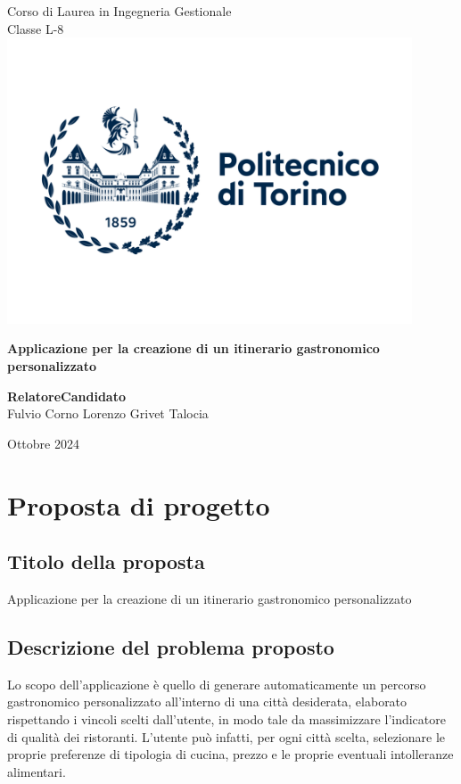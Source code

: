 \documentclass{report}
\begin{document}
\thispagestyle{empty}
\begin{center}
    \Large Corso di Laurea in Ingegneria Gestionale\\
\Large Classe L-8\\[2cm]

\includegraphics[width=12cm]{images/Logo_PoliTo_scritta.png}

\vspace*{2cm}

{\Huge \bfseries Applicazione per la creazione di un itinerario gastronomico personalizzato}

\vfill

{\Large \bfseries Relatore\hfill Candidato}\\
{\Large Fulvio Corno \hfill Lorenzo Grivet Talocia}

\vspace*{1cm}
{\Large Ottobre 2024}

\end{center}


\tableofcontents

\hypersetup{
linkcolor=lnkcolor
}

\chapter{Proposta di progetto}\label{cap_proposta}

\section{Titolo della proposta}\label{sec_titolo}
Applicazione per la creazione di un itinerario gastronomico personalizzato

\section{Descrizione del problema proposto}\label{sec_descrizione}
Lo scopo dell'applicazione è quello di generare automaticamente un percorso gastronomico personalizzato all'interno di una città desiderata, elaborato rispettando i vincoli scelti dall'utente, in modo tale da massimizzare l'indicatore di qualità dei ristoranti. L'utente può infatti, per ogni città scelta, selezionare le proprie preferenze di tipologia di cucina, prezzo e le proprie eventuali intolleranze alimentari. 
\end{document}
